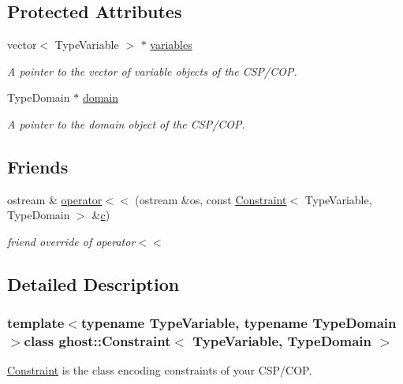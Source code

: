 \subsection*{Protected Attributes}
\begin{DoxyCompactItemize}
\item 
vector$<$ Type\-Variable $>$ $\ast$ \hyperlink{classghost_1_1Constraint_a827e487bd77c8dbc4701d1dfae39678a}{variables}
\begin{DoxyCompactList}\small\item\em A pointer to the vector of variable objects of the C\-S\-P/\-C\-O\-P. \end{DoxyCompactList}\item 
Type\-Domain $\ast$ \hyperlink{classghost_1_1Constraint_a0ea15d113ab23ddb6ad74be72f7ac90d}{domain}
\begin{DoxyCompactList}\small\item\em A pointer to the domain object of the C\-S\-P/\-C\-O\-P. \end{DoxyCompactList}\end{DoxyCompactItemize}
\subsection*{Friends}
\begin{DoxyCompactItemize}
\item 
ostream \& \hyperlink{classghost_1_1Constraint_a5fb3db9a0881ff7aae65d680386277f0}{operator$<$$<$} (ostream \&os, const \hyperlink{classghost_1_1Constraint}{Constraint}$<$ Type\-Variable, Type\-Domain $>$ \&\hyperlink{namespaceghost_a1e04a626798fce7a46db973e9693354e}{c})
\begin{DoxyCompactList}\small\item\em friend override of operator$<$$<$ \end{DoxyCompactList}\end{DoxyCompactItemize}


\subsection{Detailed Description}
\subsubsection*{template$<$typename Type\-Variable, typename Type\-Domain$>$class ghost\-::\-Constraint$<$ Type\-Variable, Type\-Domain $>$}

\hyperlink{classghost_1_1Constraint}{Constraint} is the class encoding constraints of your C\-S\-P/\-C\-O\-P. 

